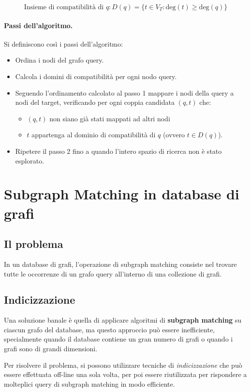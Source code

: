 \[
\text{Insieme di compatibilità di } q: D(q) = \{t \in V_T: \text{deg}(t) \geq \text{deg}(q)\}
\]

\paragraph{Passi dell'algoritmo.}
Si definiscono così i passi dell'algoritmo:
\begin{itemize}
    \item Ordina i nodi del grafo query.
    \item Calcola i domini di compatibilità per ogni nodo query.
    \item Seguendo l'ordinamento calcolato al passo 1 mappare i nodi della query a nodi del target, verificando per ogni coppia candidata $(q, t)$ che:
    \begin{itemize}
        \item $(q, t)$ non siano già stati mappati ad altri nodi
        \item $t$ appartenga al dominio di compatibilità di $q$ (ovvero $t \in D(q)$).
    \end{itemize}
    \item Ripetere il passo 2 fino a quando l'intero spazio di ricerca non è stato esplorato.
\end{itemize}

\section{Subgraph Matching in database di grafi}
\subsection{Il problema}
In un database di grafi, l'operazione di subgraph matching consiste nel trovare tutte le occorrenze di un grafo query all'interno di una collezione di grafi.

\subsection{Indicizzazione}
Una soluzione banale è quella di applicare algoritmi di \textbf{subgraph matching} su ciascun grafo del database, ma questo approccio può essere inefficiente, specialmente quando il database contiene un gran numero di grafi o quando i grafi sono di grandi dimensioni.

Per risolvere il problema, si possono utilizzare tecniche di \emph{indicizzazione} che può essere effettuata off-line una sola volta, per poi essere riutilizzata per rispondere a molteplici query di subgraph matching in modo efficiente.

